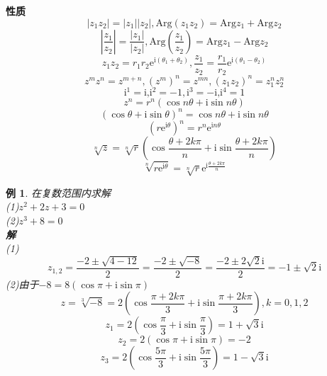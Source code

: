 \documentclass[12pt, a4paper, twoside]{ctexbook}
\newtheorem{example}[theorem]{例}
\begin{document}
\textbf{性质}
$$
\left| z_1z_2 \right|=\left| z_1 \right|\left| z_2 \right|,\text{Arg}\left( z_1z_2 \right) =\text{Arg}z_1+\text{Arg}z_2
$$
$$
\left| \frac{z_1}{z_2} \right|=\frac{\left| z_1 \right|}{\left| z_2 \right|},\text{Arg}\left( \frac{z_1}{z_2} \right) =\text{Arg}z_1-\text{Arg}z_2
$$
$$
z_1z_2=r_1r_2\text{e}^{\text{i}\left( \theta _1+\theta _2 \right)},\frac{z_1}{z_2}=\frac{r_1}{r_2}\text{e}^{\text{i}\left( \theta _1-\theta _2 \right)}
$$
$$
z^mz^n=z^{m+n},\left( z^m \right) ^n=z^{mn},\left( z_1z_2 \right) ^n=z_{1}^{n}z_{2}^{n}
$$
$$
\text{i}^1=\text{i,i}^2=-1,\text{i}^3=-\text{i,i}^4=1
$$
$$
z^n=r^n\left( \cos n\theta +\text{i}\sin n\theta \right) 
$$
$$
\left( \cos \theta +\text{i}\sin \theta \right) ^n=\cos n\theta +\text{i}\sin n\theta 
$$
$$
\left( r\text{e}^{\text{i}\theta} \right) ^n=r^n\text{e}^{\text{i}n\theta}
$$
$$
\sqrt[n]{z}=\sqrt[n]{r}\left( \cos \frac{\theta +2k\pi}{n}+\text{i}\sin \frac{\theta +2k\pi}{n} \right) 
$$
$$
\sqrt[n]{r\text{e}^{\text{i}\theta}}=\sqrt[n]{r}\text{e}^{\text{i}\frac{\theta +2k\pi}{n}}
$$
\begin{example}
	在复数范围内求解\\
	\hspace*{2em}(1)$z^2+2z+3=0$\\
	\hspace*{2em}(2)$z^3+8=0$\\
	\hspace*{1em}\textbf{解}\\
	\hspace*{2em}(1)
	$$
	z_{1,2}=\frac{-2\pm \sqrt{4-12}}{2}=\frac{-2\pm \sqrt{-8}}{2}=\frac{-2\pm 2\sqrt{2}\mathrm{i}}{2}=-1\pm \sqrt{2}\mathrm{i}
	$$
	\newpage
	(2)由于$-8=8\left(\cos \pi+\mathrm{i}\sin \pi\right)$
	$$
	z=\sqrt[3]{-8}=2\left(\cos \frac{\pi +2k\pi}{3}+\mathrm{i}\sin \frac{\pi+2k\pi}{3}\right),k=0,1,2
	$$
	$$
	z_1=2\left(\cos\frac{\pi}{3}+\mathrm{i}\sin\frac{\pi}{3}\right)=1+\sqrt{3}\mathrm{i}
	$$
	$$
	z_2=2\left(\cos\pi+\mathrm{i}\sin\pi\right)=-2
	$$
	$$
	z_3=2\left(\cos\frac{5\pi}{3}+\mathrm{i}\sin\frac{5\pi}{3}\right)=1-\sqrt{3}\mathrm{i}
	$$
\end{example}
\end{document}
